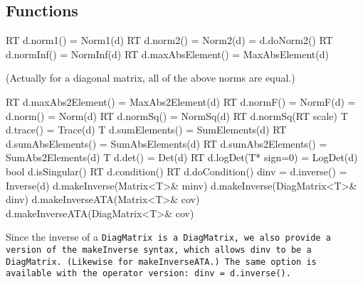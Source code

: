 \subsection{Functions}
\label{DiagMatrix_Functions}

\begin{tmvcode}
RT d.norm1() = Norm1(d)
RT d.norm2() = Norm2(d) = d.doNorm2()
RT d.normInf() = NormInf(d)
RT d.maxAbsElement() = MaxAbsElement(d)
\end{tmvcode}
(Actually for a diagonal matrix, all of the above norms are equal.)
\begin{tmvcode}
RT d.maxAbs2Element() = MaxAbs2Element(d)
RT d.normF() = NormF(d) = d.norm() = Norm(d)
RT d.normSq() = NormSq(d)
RT d.normSq(RT scale)
T d.trace() = Trace(d)
T d.sumElements() = SumElements(d)
RT d.sumAbsElements() = SumAbsElements(d)
RT d.sumAbs2Elements() = SumAbs2Elements(d)
T d.det() = Det(d)
RT d.logDet(T* sign=0) = LogDet(d)
bool d.isSingular()
RT d.condition()
RT d.doCondition()
dinv = d.inverse() = Inverse(d)
d.makeInverse(Matrix<T>& minv)
d.makeInverse(DiagMatrix<T>& dinv)
d.makeInverseATA(Matrix<T>& cov)
d.makeInverseATA(DiagMatrix<T>& cov)
\end{tmvcode}
Since the inverse of a \tt{DiagMatrix} is a \tt{DiagMatrix},
we also provide a version of the \tt{makeInverse} syntax, which allows dinv
to be a \tt{DiagMatrix}.  (Likewise for \tt{makeInverseATA}.)  The same option is 
available with the operator version: \tt{dinv = d.inverse()}.


